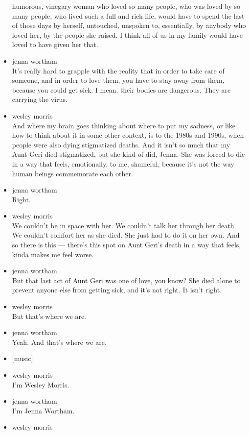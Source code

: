 \begin{itemize}
  humorous, vinegary woman who loved so many people, who was loved by so
  many people, who lived such a full and rich life, would have to spend
  the last of those days by herself, untouched, unspoken to,
  essentially, by anybody who loved her, by the people she raised. I
  think all of us in my family would have loved to have given her that.
\item
  jenna wortham\\
  It's really hard to grapple with the reality that in order to take
  care of someone, and in order to love them, you have to stay away from
  them, because you could get sick. I mean, their bodies are dangerous.
  They are carrying the virus.
\item
  wesley morris\\
  And where my brain goes thinking about where to put my sadness, or
  like how to think about it in some other context, is to the 1980s and
  1990s, when people were also dying stigmatized deaths. And it isn't so
  much that my Aunt Geri died stigmatized, but she kind of did, Jenna.
  She was forced to die in a way that feels, emotionally, to me,
  shameful, because it's not the way human beings commemorate each
  other.
\item
  jenna wortham\\
  Right.
\item
  wesley morris\\
  We couldn't be in space with her. We couldn't talk her through her
  death. We couldn't comfort her as she died. She just had to do it on
  her own. And so there is this --- there's this spot on Aunt Geri's
  death in a way that feels, kinda makes me feel worse.
\item
  jenna wortham\\
  But that last act of Aunt Geri was one of love, you know? She died
  alone to prevent anyone else from getting sick, and it's not right. It
  isn't right.
\item
  wesley morris\\
  But that's where we are.
\item
  jenna wortham\\
  Yeah. And that's where we are.
\item
  {[}music{]}
\item
  wesley morris\\
  I'm Wesley Morris.
\item
  jenna wortham\\
  I'm Jenna Wortham.
\item
  wesley morris\\

\end{itemize}
